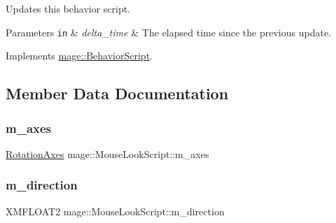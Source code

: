 Updates this behavior script.


\begin{DoxyParams}[1]{Parameters}
\mbox{\tt in}  & {\em delta\+\_\+time} & The elapsed time since the previous update. \\
\hline
\end{DoxyParams}


Implements \hyperlink{classmage_1_1_behavior_script_a905b6c83640cb91d19fecab3435f6feb}{mage\+::\+Behavior\+Script}.



\subsection{Member Data Documentation}
\hypertarget{classmage_1_1_mouse_look_script_ab5df1b96d5860a9b8f30256e7c89b26b}{}\label{classmage_1_1_mouse_look_script_ab5df1b96d5860a9b8f30256e7c89b26b} 
\subsubsection{\texorpdfstring{m\+\_\+axes}{m\_axes}}
{\footnotesize\ttfamily \hyperlink{classmage_1_1_mouse_look_script_af63fd955f796c11e0378813e5d1ab5f8}{Rotation\+Axes} mage\+::\+Mouse\+Look\+Script\+::m\+\_\+axes\hspace{0.3cm}{\ttfamily [private]}}

\hypertarget{classmage_1_1_mouse_look_script_a07c9a61869dab687a0426fa0c4b41fa7}{}\label{classmage_1_1_mouse_look_script_a07c9a61869dab687a0426fa0c4b41fa7} 
\subsubsection{\texorpdfstring{m\+\_\+direction}{m\_direction}}
{\footnotesize\ttfamily X\+M\+F\+L\+O\+A\+T2 mage\+::\+Mouse\+Look\+Script\+::m\+\_\+direction\hspace{0.3cm}{\ttfamily [private]}}

\hypertarget{classmage_1_1_mouse_look_script_a0d5f2933555b76efd7cf83c7672574dd}{}\label{classmage_1_1_mouse_look_script_a0d5f2933555b76efd7cf83c7672574dd} 

